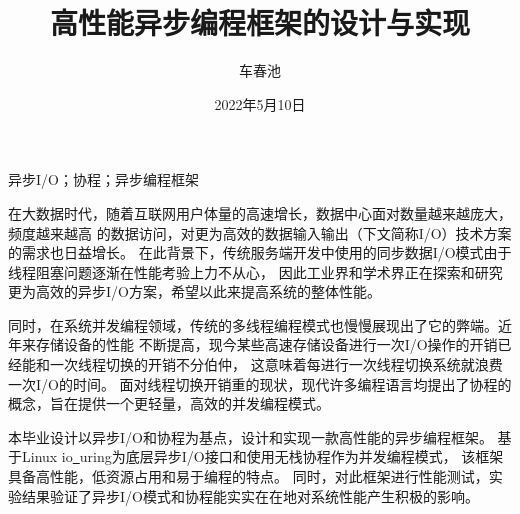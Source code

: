 \documentclass[supercite]{HustGraduPaper}
\title{高性能异步编程框架的设计与实现}
\author{车春池}
\date{2022年5月10日}
\theoremstyle{definition}
\begin{document}
\maketitle

\statement

\clearpage


\begin{cnabstract}{异步I/O；协程；异步编程框架}

在大数据时代，随着互联网用户体量的高速增长，数据中心面对数量越来越庞大，频度越来越高
的数据访问，对更为高效的数据输入输出（下文简称I/O）技术方案的需求也日益增长。
在此背景下，传统服务端开发中使用的同步数据I/O模式由于线程阻塞问题逐渐在性能考验上力不从心，
因此工业界和学术界正在探索和研究更为高效的异步I/O方案，希望以此来提高系统的整体性能。\par

同时，在系统并发编程领域，传统的多线程编程模式也慢慢展现出了它的弊端。近年来存储设备的性能
不断提高，现今某些高速存储设备进行一次I/O操作的开销已经能和一次线程切换的开销不分伯仲，
这意味着每进行一次线程切换系统就浪费一次I/O的时间。
面对线程切换开销重的现状，现代许多编程语言均提出了协程的概念，旨在提供一个更轻量，高效的并发编程模式。\par

本毕业设计以异步I/O和协程为基点，设计和实现一款高性能的异步编程框架。
基于Linux io\underline{~}uring为底层异步I/O接口和使用无栈协程作为并发编程模式，
该框架具备高性能，低资源占用和易于编程的特点。
同时，对此框架进行性能测试，实验结果验证了异步I/O模式和协程能实实在在地对系统性能产生积极的影响。

\end{cnabstract}
\end{document}
